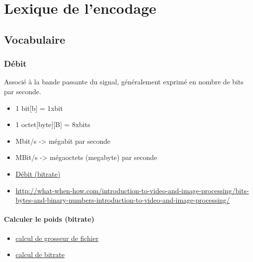 \documentclass[
  french,
]{book}
\providecommand{\tightlist}{%
  \setlength{\itemsep}{0pt}\setlength{\parskip}{0pt}}
\begin{document}
\hypertarget{lexique_encodage}{%
\section{Lexique de l'encodage}\label{lexique_encodage}}

\hypertarget{vocabulaire}{%
\subsection{Vocabulaire}\label{vocabulaire}}

\hypertarget{duxe9bit}{%
\subsubsection{Débit}\label{duxe9bit}}

Associé à la bande passante du signal, généralement exprimé en nombre de bits par seconde.

\begin{itemize}
\item
  1 bit{[}b{]} = 1xbit
\item
  1 octet{[}byte{]}{[}B{]} = 8xbits
\item
  Mbit/s -\textgreater{} mégabit par seconde
\item
  MBit/s -\textgreater{} mégaoctets (megabyte) par seconde
\item
  \href{https://en.wikipedia.org/wiki/Bit_rate\#Video}{Débit (bitrate)}
\item
  \url{http://what-when-how.com/introduction-to-video-and-image-processing/bits-bytes-and-binary-numbers-introduction-to-video-and-image-processing/}
\end{itemize}

\hypertarget{calculer-le-poids-bitrate}{%
\paragraph{Calculer le poids (bitrate)}\label{calculer-le-poids-bitrate}}

\begin{itemize}
\tightlist
\item
  \href{https://toolstud.io/video/filesize.php?imagewidth=1920\&imageheight=1080\&framerate=29.97\&timeduration=60\&timeunit=seconds}{calcul de grosseur de fichier}
\item
  \href{https://toolstud.io/video/bitrate.php?imagewidth=1\&imageheight=1\&colordepth=24\&framerate=29.97}{calcul de bitrate}
\end{itemize}
\end{document}

